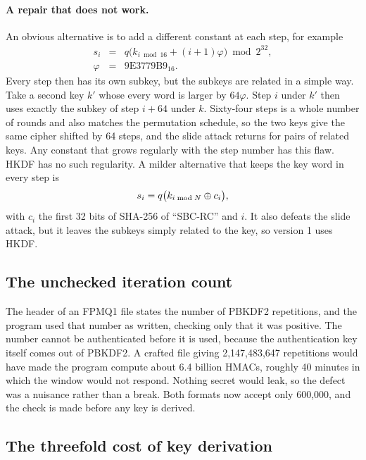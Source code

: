 \paragraph{A repair that does not work.}
An obvious alternative is to add a different constant at each step, for
example
\begin{eqnarray}
s_i &=& q\bigl(k_{i \bmod 16} + (i+1)\varphi\bigr) \bmod 2^{32},
\label{eq:additive_A} \\
\varphi &=& \mathrm{9E3779B9}_{16}. \label{eq:additive_B}
\end{eqnarray}
Every step then has its own subkey, but the subkeys are related in a simple
way. Take a second key $k'$ whose every word is larger by $64\varphi$. Step $i$
under $k'$ then uses exactly the subkey of step $i+64$ under $k$. Sixty-four
steps is a whole number of rounds and also matches the permutation schedule, so
the two keys give the same cipher shifted by 64 steps, and the slide attack
returns for pairs of related keys. Any constant that grows regularly with the
step number has this flaw. HKDF has no such regularity. A milder alternative
that keeps the key word in every step is
\begin{equation}
s_i = q\bigl(k_{i \bmod N} \oplus c_i\bigr),
\label{eq:table}
\end{equation}
with $c_i$ the first 32 bits of SHA-256 of ``SBC-RC'' and $i$. It also defeats
the slide attack, but it leaves the subkeys simply related to the key, so
version 1 uses HKDF.

\subsection{The unchecked iteration count}

The header of an FPMQ1 file states the number of PBKDF2 repetitions, and the
program used that number as written, checking only that it was positive. The
number cannot be authenticated before it is used, because the authentication
key itself comes out of PBKDF2. A crafted file giving 2,147,483,647 repetitions
would have made the program compute about 6.4 billion HMACs, roughly 40 minutes
in which the window would not respond. Nothing secret would leak, so the defect
was a nuisance rather than a break. Both formats now accept only 600,000, and
the check is made before any key is derived.

\subsection{The threefold cost of key derivation}

